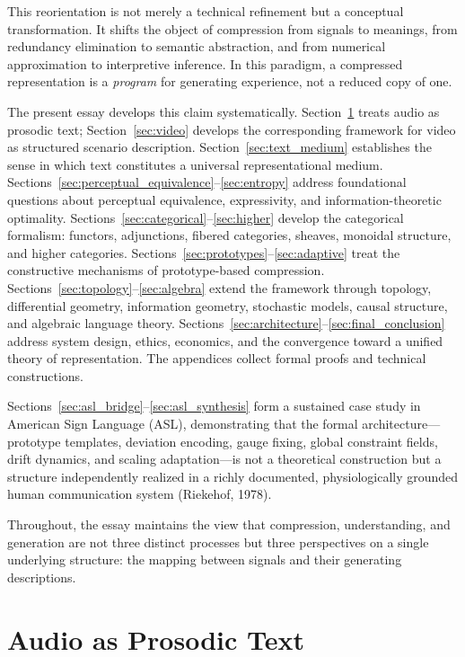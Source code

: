 \documentclass[11pt,a4paper]{article}
\theoremstyle{definition}
\theoremstyle{remark}
\begin{document}
This reorientation is not merely a technical refinement but a conceptual transformation. It shifts the object of compression from signals to meanings, from redundancy elimination to semantic abstraction, and from numerical approximation to interpretive inference. In this paradigm, a compressed representation is a \emph{program} for generating experience, not a reduced copy of one.

The present essay develops this claim systematically. Section~\ref{sec:audio} treats audio as prosodic text; Section~\ref{sec:video} develops the corresponding framework for video as structured scenario description. Section~\ref{sec:text_medium} establishes the sense in which text constitutes a universal representational medium. Sections~\ref{sec:perceptual_equivalence}--\ref{sec:entropy} address foundational questions about perceptual equivalence, expressivity, and information-theoretic optimality. Sections~\ref{sec:categorical}--\ref{sec:higher} develop the categorical formalism: functors, adjunctions, fibered categories, sheaves, monoidal structure, and higher categories. Sections~\ref{sec:prototypes}--\ref{sec:adaptive} treat the constructive mechanisms of prototype-based compression. Sections~\ref{sec:topology}--\ref{sec:algebra} extend the framework through topology, differential geometry, information geometry, stochastic models, causal structure, and algebraic language theory. Sections~\ref{sec:architecture}--\ref{sec:final_conclusion} address system design, ethics, economics, and the convergence toward a unified theory of representation. The appendices collect formal proofs and technical constructions.

Sections~\ref{sec:asl_bridge}--\ref{sec:asl_synthesis} form a sustained case study in American Sign Language (ASL), demonstrating that the formal architecture---prototype templates, deviation encoding, gauge fixing, global constraint fields, drift dynamics, and scaling adaptation---is not a theoretical construction but a structure independently realized in a richly documented, physiologically grounded human communication system (Riekehof, 1978).

Throughout, the essay maintains the view that compression, understanding, and generation are not three distinct processes but three perspectives on a single underlying structure: the mapping between signals and their generating descriptions.

\section{Audio as Prosodic Text}
\label{sec:audio}
\end{document}
